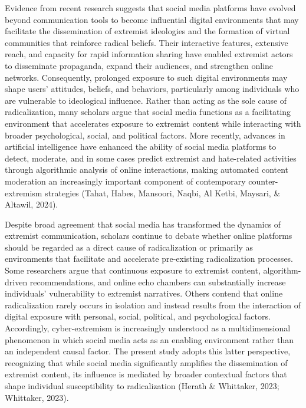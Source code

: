 \documentclass[10pt]{NSP1}
\begin{document}
	Evidence from recent research suggests that social media platforms have evolved beyond communication tools to become influential digital environments that may facilitate the dissemination of extremist ideologies and the formation of virtual communities that reinforce radical beliefs. Their interactive features, extensive reach, and capacity for rapid information sharing have enabled extremist actors to disseminate propaganda, expand their audiences, and strengthen online networks. Consequently, prolonged exposure to such digital environments may shape users' attitudes, beliefs, and behaviors, particularly among individuals who are vulnerable to ideological influence. Rather than acting as the sole cause of radicalization, many scholars argue that social media functions as a facilitating environment that accelerates exposure to extremist content while interacting with broader psychological, social, and political factors. More recently, advances in artificial intelligence have enhanced the ability of social media platforms to detect, moderate, and in some cases predict extremist and hate-related activities through algorithmic analysis of online interactions, making automated content moderation an increasingly important component of contemporary counter-extremism strategies (Tahat, Habes, Mansoori, Naqbi, Al Ketbi, Maysari, \& Altawil, 2024).
	
	Despite broad agreement that social media has transformed the dynamics of extremist communication, scholars continue to debate whether online platforms should be regarded as a direct cause of radicalization or primarily as environments that facilitate and accelerate pre-existing radicalization processes. Some researchers argue that continuous exposure to extremist content, algorithm-driven recommendations, and online echo chambers can substantially increase individuals' vulnerability to extremist narratives. Others contend that online radicalization rarely occurs in isolation and instead results from the interaction of digital exposure with personal, social, political, and psychological factors. Accordingly, cyber-extremism is increasingly understood as a multidimensional phenomenon in which social media acts as an enabling environment rather than an independent causal factor. The present study adopts this latter perspective, recognizing that while social media significantly amplifies the dissemination of extremist content, its influence is mediated by broader contextual factors that shape individual susceptibility to radicalization (Herath \& Whittaker, 2023; Whittaker, 2023).
	
\end{document}

